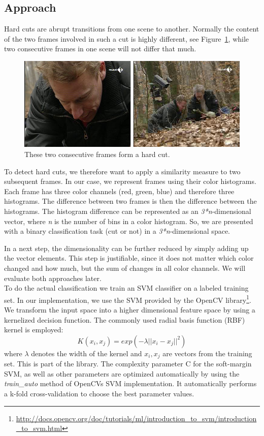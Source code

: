 \subsection{Approach}
\label{sec:hard_cut_approach}

Hard cuts are abrupt transitions from one scene to another.
Normally the content of the two frames involved in such a cut is highly different, see Figure~\ref{fig:hard_cut_example}, while two consecutive frames in one scene will not differ that much.

\begin{figure}
	\centering
	\includegraphics[scale=.7]{images/hard_cut_example.png}
	\caption{These two consecutive frames form a hard cut.}
	\label{fig:hard_cut_example}
\end{figure}

To detect hard cuts, we therefore want to apply a similarity measure to two subsequent frames.
In our case, we represent frames using their color histograms.
Each frame has three color channels (red, green, blue) and therefore three histograms.
The difference between two frames is then the difference between the histograms.
The histogram difference can be represented as an \emph{3*n}-dimensional vector, where \emph{n} is the number of bins in a color histogram.
So, we are presented with a binary classification task (cut or not) in a \emph{3*n}-dimensional space.

In a next step, the dimensionality can be further reduced by simply adding up the vector elements.
This step is justifiable, since it does not matter which color changed and how much, but the sum of changes in all color channels.
We will evaluate both approaches later. \\
To do the actual classification we train an SVM classifier on a labeled training set.
In our implementation, we use the SVM provided by the OpenCV library\footnote{\url{http://docs.opencv.org/doc/tutorials/ml/introduction_to_svm/introduction_to_svm.html}}.
We transform the input space into a higher dimensional feature space by using a kernelized decision function. The commonly used radial basis function (RBF) kernel is employed:
$$K(x_i,x_j) = exp(-\lambda || x_i - x_j ||^2)$$
where $\lambda$ denotes the width of the kernel and $x_i, x_j $ are vectors from the training set.
This is part of the library.
The complexity parameter C for the soft-margin SVM, as well as other parameters are optimized automatically by using the \emph{train\_auto} method of OpenCVs SVM implementation.
It automatically performs a k-fold cross-validation to choose the best parameter values.
